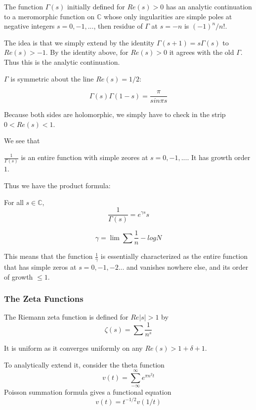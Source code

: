\documentclass[main.tex]{subfiles}
\begin{document}
\begin{theorem}
The function $\Gamma(s)$ initially defined for $Re(s) > 0$ has an analytic continuation to a meromorphic function on $\mathbb{C}$ whose only ingularities are simple poles at negative integers $s = 0, -1, ... $, then residue of $\Gamma$ at $s = -n$ is $(-1)^n /n!$.
\end{theorem}
The idea is that we simply extend by the identity $\Gamma(s+ 1) = s \Gamma(s)$ to $Re(s) > -1$. By the identity above, for $Re(s) > 0$ it agrees with the old $\Gamma$. Thus this is the analytic continuation.

$\Gamma$ is symmetric about the line $Re(s) = 1/2$:

\begin{theorem}
$$
\Gamma(s) \Gamma(1-s) = \frac{\pi}{sin \pi s}
$$
\end{theorem}
Because both sides are holomorphic, we simply have to check in the strip $0 < Re(s) < 1$.

We see that 
\begin{theorem}
$\frac{1}{\Gamma(s)}$ is an entire function with simple zeores at $s = 0, -1, ...$. It has growth order $1$.
\end{theorem}

Thus we have the product formula:

\begin{theorem}
For all $s \in \mathbb{C}$, 
$$
\frac{1}{\Gamma(s)} = e^{\gamma s} s 
$$
\end{theorem}

$$\gamma = \lim \sum \frac{1}{n} - log N$$

This means that the function $\frac{1}{\gamma}$ is essentially characterized as the entire function that has simple zeros at $s = 0, -1, -2...$ and vanishes nowhere else, and its order of growth $\leq 1$.


\subsubsection{The Zeta Functions}

The Riemann zeta function is defined for $Re|s| > 1$ by 
$$
\zeta(s) = \sum \frac{1}{n^s}
$$

It is uniform as it converges uniformly on any $Re(s) > 1 + \delta + 1$.

To analytically extend it, consider the theta function 
$$
v(t) = \sum_{-\infty} ^{\infty} e^{\pi n^2 t}
$$
Poisson summation formula gives a functional equation 
$$
v(t) = t^{-1/2} v(1/t)
$$
\end{document}
